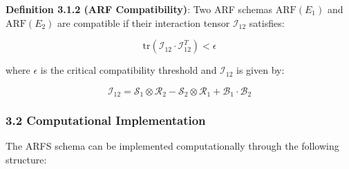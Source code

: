 \documentclass[
]{article}
\begin{document}
\textbf{Definition 3.1.2 (ARF Compatibility)}: Two ARF schemas
\(\text{ARF}(E_1)\) and \(\text{ARF}(E_2)\) are compatible if their
interaction tensor \(\mathcal{I}_{12}\) satisfies:

\[\text{tr}(\mathcal{I}_{12} \cdot \mathcal{I}_{12}^T) < \epsilon\]

where \(\epsilon\) is the critical compatibility threshold and
\(\mathcal{I}_{12}\) is given by:

\[\mathcal{I}_{12} = \mathcal{S}_1 \otimes \mathcal{R}_2 - \mathcal{S}_2 \otimes \mathcal{R}_1 + \mathcal{B}_1 \cdot \mathcal{B}_2\]

\subsubsection{3.2 Computational
Implementation}\label{computational-implementation}

The ARFS schema can be implemented computationally through the following
structure:
\end{document}
